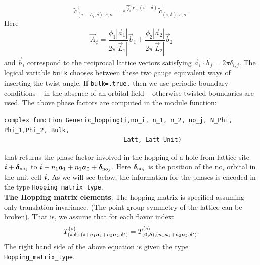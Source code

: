 \begin{equation}
\tilde{c}^{\dagger}_{(i + L_i,\delta) ,s,\sigma }   =  e^{\frac{2 \pi i }{\Phi_0} \chi_{L_i} ( i + \delta ) } \, \tilde{c}^{\dagger}_{(i,\delta) ,s,\sigma }.
\end{equation}
Here 
\begin{equation}
\vec{A}_{\phi} =\frac{  \phi_1  |\vec{a}_1|} { 2 \pi |\vec{L}_1| } \vec{b}_1 +  \frac{  \phi_2  |\vec{a}_2|}{2 \pi  |\vec{L}_2| } \vec{b}_2
\end{equation}
and $\vec{b}_i$  correspond to the reciprocal lattice vectors satisfying  $ \vec{a}_i  \cdot  \vec{b}_j  = 2 \pi \delta_{i,j} $.   The logical variable $\texttt{bulk} $ chooses between these two  gauge equivalent ways  of inserting the twist angle. If \texttt{bulk=.true.} then  we use periodic boundary conditions  --  in the absence of an orbital field -- otherwise  twisted boundaries are used.  
The above phase factors are computed  in the   module function: 
\begin{lstlisting}[style=fortran]
complex function Generic_hopping(i,no_i, n_1, n_2, no_j, N_Phi, Phi_1,Phi_2, Bulk, 
                                 Latt, Latt_Unit)
\end{lstlisting}
that  returns the  phase factor involved in the hopping of a hole from lattice site $ \boldsymbol{i} + \boldsymbol{\delta}_{\text{no}_i} $ to 
$\boldsymbol{i} + n_1 \boldsymbol{a}_1 + n_1 \boldsymbol{a}_2+ \boldsymbol{\delta}_{\text{no}_j}  $.  Here  $\boldsymbol{\delta}_{\text{no}_i}$  is  the position of the $\text{no}_i$  orbital in the unit cell
$\boldsymbol{i}$. 
As  we will see below, the information for the phases is encoded in  the type \texttt{Hopping\_matrix\_type}.\\

\noindent
\textbf{The  Hopping matrix elements}. 
The hopping matrix  is specified assuming only translation invariance.  (The point group symmetry of the lattice can be broken).
That is, we assume that  for  each flavor index:
\begin{equation} 
T_{(\boldsymbol{i},\boldsymbol{\delta}), (\boldsymbol{i} +  n_1\boldsymbol{a}_1  + n_2 \boldsymbol{a}_2,\boldsymbol{\delta}')}^{(s)}   =   T^{(s)}_{(\boldsymbol{0},\boldsymbol{\delta}),  (n_1\boldsymbol{a}_1  + n_2 \boldsymbol{a}_2,\boldsymbol{\delta}') }.
\label{Hop.eq}	 
\end{equation}
The right  hand side of the above equation is given  the type  \texttt{Hopping\_matrix\_type}.\\


